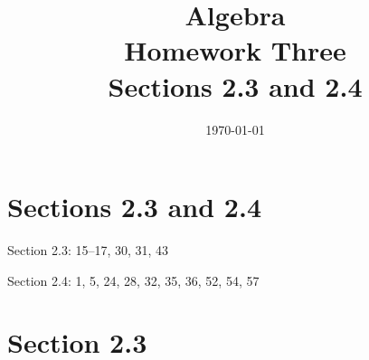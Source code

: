 \documentclass[letterpaper]{exam}
\title{Algebra \\ Homework Three \\ Sections 2.3 and 2.4}
\author{}
\date{\today}
\begin{document}
  \maketitle

  \section{Sections 2.3 and 2.4}
  \begin{itemize*}
    \item Section 2.3: 15--17, 30, 31, 43
    \item Section 2.4: 1, 5, 24, 28, 32, 35, 36, 52, 54, 57
  \end{itemize*}

  \ifprintanswers{}
    \section{Section 2.3}
\end{document}
